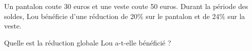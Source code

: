 
Un pantalon coute 30 euros et une veste coute 50 euros. Durant la période des soldes, Lou bénéficie d'une réduction de 20\% sur le pantalon et de 24\% sur la veste.

 Quelle est la réduction globale Lou a-t-elle bénéficié ?